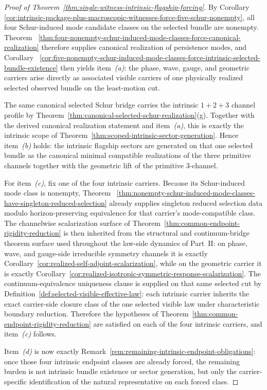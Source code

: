 \begin{proof}[Proof of Theorem~\ref{thm:single-witness-intrinsic-flagship-forcing}]
\label{proof:thm:single-witness-intrinsic-flagship-forcing}
By Corollary~
\ref{cor:intrinsic-package-plus-macroscopic-witnesses-force-five-schur-nonempty},
all four Schur-induced mode candidate classes on the selected bundle are
nonempty. Theorem~
\ref{thm:four-nonempty-schur-induced-mode-classes-force-canonical-realization}
therefore supplies canonical realization of persistence modes, and
Corollary~
\ref{cor:five-nonempty-schur-induced-mode-classes-force-intrinsic-selected-bundle-existence}
then yields item~\emph{(a)}: the phase, wave, gauge, and geometric carriers
arise directly as associated visible carriers of one physically realized
selected observed bundle on the least-motion cut.

The same canonical selected Schur bridge carries the intrinsic
\(1+2+3\) channel profile by
Theorem~\ref{thm:canonical-selected-schur-realization}(g). Together with the
derived canonical realization statement and item~\emph{(a)}, this is exactly
the intrinsic scope of Theorem~\ref{thm:scoped-intrinsic-sector-generation}.
Hence item~\emph{(b)} holds: the intrinsic flagship sectors are generated on
that one selected bundle as the canonical minimal compatible realizations of
the three primitive channels together with the geometric lift of the primitive
\(3\)-channel.

For item~\emph{(c)}, fix one of the four intrinsic carriers. Because its
Schur-induced mode class is nonempty, Theorem~
\ref{thm:nonempty-schur-induced-mode-classes-have-singleton-reduced-selection}
already supplies singleton reduced selection data modulo horizon-preserving
equivalence for that carrier's mode-compatible class. The channelwise
scalarization surface of
Theorem~\ref{thm:common-endpoint-rigidity-reduction} is then inherited from the
structural and continuum-bridge theorem surface used throughout the law-side
dynamics of Part~II: on phase, wave, and
gauge-side irreducible symmetry channels it is exactly
Corollary~\ref{cor:realized-self-adjoint-scalarization}, while on the geometric
carrier it is exactly
Corollary~\ref{cor:realized-isotropic-symmetric-response-scalarization}. The
continuum-equivalence uniqueness clause is supplied on that same selected cut
by Definition~\ref{def:selected-visible-effective-law}: each intrinsic carrier
inherits the exact carrier-side closure class of the one selected visible law
under characteristic boundary reduction. Therefore the hypotheses of
Theorem~\ref{thm:common-endpoint-rigidity-reduction} are satisfied on each of
the four intrinsic carriers, and item~\emph{(c)} follows.

Item~\emph{(d)} is now exactly
Remark~\ref{rem:remaining-intrinsic-endpoint-obligations}: once those four
intrinsic endpoint classes are already forced, the remaining burden is not
intrinsic bundle existence or sector generation, but only the carrier-specific
identification of the natural representative on each forced class.
\end{proof}

